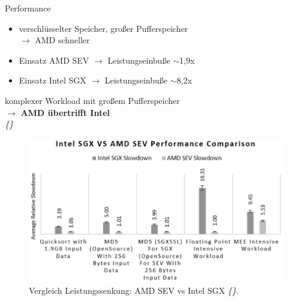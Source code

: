 \documentclass{sdqbeamer}
\begin{document}
\begin{frame}{Performance}
	\begin{minipage}{0.49\linewidth}
		\begin{itemize}
			\item verschlüsselter Speicher, großer Pufferspeicher \\ \(\rightarrow\) AMD schneller
			\item Einsatz AMD SEV \(\rightarrow\) Leistungseinbuße \begin{math} \sim \end{math}1,9x
			\item Einsatz Intel SGX  \(\rightarrow\) Leistungseinbuße \begin{math} \sim \end{math}8,2x
		\end{itemize}
		\vfill
		\color{kitgreen}
		{komplexer Workload mit großem Pufferspeicher\\ \(\rightarrow\) \textbf{AMD übertrifft Intel}}
		\color{black}\\
		\vspace{3ex}
		\vfill
		\small\textit{\{\cite{mofrad}\}}
	\end{minipage}
	\begin{minipage}{0.5\linewidth}
		\begin{figure}[!h]
			\centering
			\includegraphics[width=\textwidth]{Bilder/performance.jpg}
			\caption{Vergleich Leistungssenkung: AMD SEV vs Intel SGX \textit{\{\cite{mofrad}\}}. }
		\end{figure}
	\end{minipage}
\end{frame}
\end{document}
